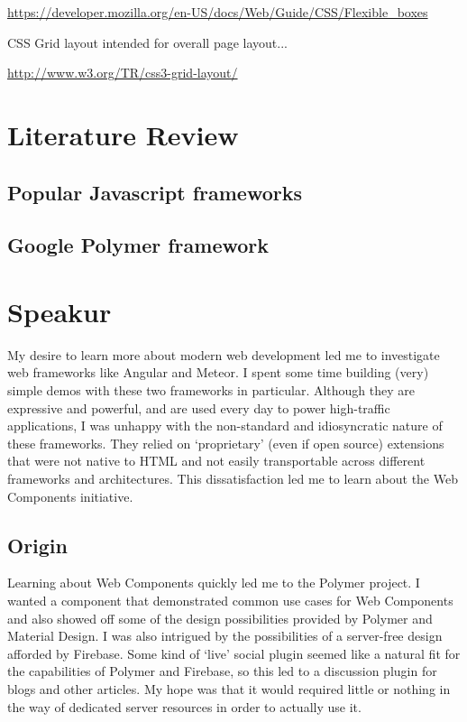 \url{https://developer.mozilla.org/en-US/docs/Web/Guide/CSS/Flexible_boxes}


CSS Grid layout intended for overall page layout...

\url{http://www.w3.org/TR/css3-grid-layout/}


\section{Literature Review}
\subsection{Popular Javascript frameworks}
\subsection{Google Polymer framework}

\section{Speakur}
My desire to learn more about modern web development led me to investigate web frameworks like Angular and Meteor.
I spent some time building (very) simple demos with these two frameworks in particular.
Although they are expressive and powerful, and are used every day to power high-traffic applications, 
I was unhappy with the non-standard and idiosyncratic nature of these frameworks. 
They relied on `proprietary' (even if open source) extensions that were not native to HTML and not easily transportable across different frameworks and architectures.
This dissatisfaction led me to learn about the Web Components initiative.

\subsection{Origin}
Learning about Web Components quickly led me to the Polymer project.
I wanted a component that demonstrated common use cases for Web Components and also showed off some of the design possibilities provided by Polymer and Material Design.
I was also intrigued by the possibilities of a server-free design afforded by Firebase.
Some kind of `live' social plugin seemed like a natural fit for the capabilities of Polymer and Firebase, so this led to a discussion plugin for blogs and other articles.
My hope was that it would required little or nothing in the way of dedicated server resources in order to actually use it. 

